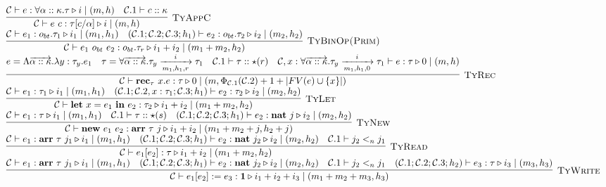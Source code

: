 \documentclass[fleqn]{article}
\begin{document}
\[\begin{array}{l}
	\infer[\textsc{TyAppC}]{\jtygc{\mathcal{C} }{ e~c }{\tau[c/\alpha] }{ i }{ m}{h}}{\jtygc{\mathcal{C} }{ e }{\forall \alpha :: \kappa. \tau }{ i }{ m}{h} & \mathcal{C}.1 \vdash c :: \kappa} \\
	
	\infer[\textsc{TyBinOp(Prim)}]{\jtygc{\mathcal{C} }{ e_1~o_{bt}~e_2 }{o_{bt}.\tau_r }{ i_1 + i_2 }{ m_1 + m_2}{h_2}}{\jtygc{\mathcal{C} }{ e_1 }{ o_{bt}.\tau_1 }{ i_1 }{ m_1}{h_1} & \jtygc{(\mathcal{C}.1;\mathcal{C}.2;\mathcal{C}.3;h_1) }{ e_2 }{ o_{bt}.\tau_2 }{ i_2 }{ m_2}{h_2}} \\
	
	\infer[\textsc{TyRec}]{\jtygc{\mathcal{C} }{ \mathbf{rec}_\tau~x. e }{ \tau }{ 0 }{ m}{\Phi_{\mathcal{C}.1}(\mathcal{C}.2)+1+|FV(e)\cup\{x\}|}}{e = \Lambda \overrightarrow{\alpha :: \kappa}. \lambda y : \tau_y. e_1 & \tau = \forall \overrightarrow{\alpha :: \kappa}. \tau_y \xrightarrow[m_1,h_1,r]{i} \tau_1 & \mathcal{C}.1 \vdash \tau :: \star(r) & \jtygc{\mathcal{C},x:\forall \overrightarrow{\alpha::\kappa}. \tau_y \xrightarrow[m_1,h_1,0]{i} \tau_1 }{ e }{ \tau }{ 0 }{ m}{h}} \\
	
	\infer[\textsc{TyLet}]{\jtygc{\mathcal{C} }{ \mathbf{let}~x=e_1~\mathbf{in}~e_2 }{ \tau_2 }{ i_1 + i_2 }{ m_1 + m_2}{h_2}}{\jtygc{\mathcal{C} }{ e_1 }{ \tau_1 }{ i_1 }{ m_1 }{h_1} & \jtygc{(\mathcal{C}.1;\mathcal{C}.2,x:\tau_1;\mathcal{C}.3;h_1) }{ e_2 }{ \tau_2 }{ i_2 }{ m_2}{h_2}} \\
	
	\infer[\textsc{TyNew}]{\jtygc{\mathcal{C} }{ \mathbf{new}~e_1~e_2 }{ \mathbf{arr}~\tau~j }{ i_1 + i_2 }{ m_1 + m_2 + j}{h_2 + j}}{\jtygc{\mathcal{C} }{ e_1 }{\tau }{ i_1 }{ m_1}{h_1} & \mathcal{C}.1 \vdash \tau :: \star(s) & \jtygc{(\mathcal{C}.1;\mathcal{C}.2;\mathcal{C}.3;h_1) }{ e_2 }{ \mathbf{nat}~j }{ i_2 }{ m_2}{h_2}} \\
	
	\infer[\textsc{TyRead}]{\jtygc{\mathcal{C} }{ e_1[e_2] }{ \tau }{ i_1 + i_2 }{ m_1 + m_2}{h_2}}{\jtygc{\mathcal{C} }{ e_1 }{ \mathbf{arr}~\tau~j_1 }{ i_1 }{ m_1}{h_1} & \jtygc{(\mathcal{C}.1;\mathcal{C}.2;\mathcal{C}.3;h_1) }{ e_2 }{ \mathbf{nat}~j_2 }{ i_2 }{ m_2}{h_2} & \mathcal{C}.1 \vdash j_2 <_n j_1} \\
	
	\infer[\textsc{TyWrite}]{\jtygc{\mathcal{C} }{ e_1[e_2] := e_3 }{ \mathbf{1} }{ i_1 + i_2 + i_3 }{ m_1 + m_2 + m_3}{h_3}}{\jtygc{\mathcal{C} }{ e_1 }{ \mathbf{arr}~\tau~j_1 }{ i_1 }{ m_1}{h_1} & \jtygc{(\mathcal{C}.1;\mathcal{C}.2;\mathcal{C}.3;h_1) }{ e_2 }{\mathbf{nat}~j_2 }{ i_2 }{ m_2}{h_2} & \mathcal{C}.1 \vdash j_2 <_n j_1 & \jtygc{(\mathcal{C}.1;\mathcal{C}.2;\mathcal{C}.3;h_2) }{ e_3 }{ \tau }{ i_3 }{ m_3}{h_3}} \\
	

\end{array}\]
\end{document}
